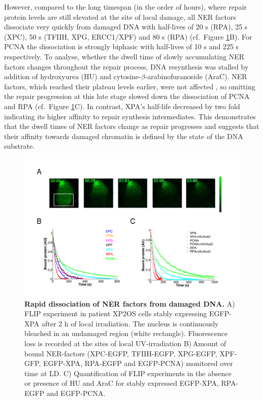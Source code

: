 However, compared to the long timespan (in the order of hours), where repair protein levels are still elevated at the site of local damage, all NER factors dissociate very quickly from damaged DNA with half-lives of 20 s (RPA), 25 s (XPC), 50 s (TFIIH, XPG, ERCC1/XPF) and 80 s (RPA) (cf.\ Figure \ref{fig:accuFlip}B). For PCNA the dissociation is strongly biphasic with half-lives of 10 s and 225 s respectively. To analyse, whether the dwell time of slowly accumulating NER factors changes throughout the repair process, DNA resynthesis was stalled by addition of hydroxyurea (HU) and cytosine-$\beta$-arabinofuranoside (AraC). NER factors, which reached their plateau levels earlier, were not affected \cite{Luijsterburg2010}, so omitting the repair progression at this late stage slowed down the dissociation of PCNA and RPA (cf.\ Figure \ref{fig:accuFlip}C). In contrast, XPA's half-life decreased by two fold indicating its higher affinity to repair synthesis intermediates. This demonstrates that the dwell times of NER factors change as repair progresses and suggests that their affinity towards damaged chromatin is defined by the state of the DNA substrate.      
           
  \begin{figure}[t]
  	\begin{center}
  		\includegraphics[width=1\textwidth]{Abbildungen/figure2_2_2.pdf}
  		\caption{\textbf{Rapid dissociation of NER factors from damaged DNA.} A) FLIP experiment in patient XP2OS cells stably expressing EGFP-XPA after 2 h of local irradiation. The nucleus is continuously bleached in an undamaged region (white rectangle). Fluorescence loss is recorded at the sites of local UV-irradiation B)\,Amount of bound NER-factors (XPC-EGFP, TFIIH-EGFP, XPG-EGFP, XPF-GFP, EGFP-XPA, RPA-EGFP and EGFP-PCNA) monitored over time at LD. C) Quantification of FLIP experiments in the absence or presence of HU and AraC for stably expressed EGFP-XPA, RPA-EGFP and EGFP-PCNA.}
  		\label{fig:accuFlip}
  	\end{center}
  \end{figure}



